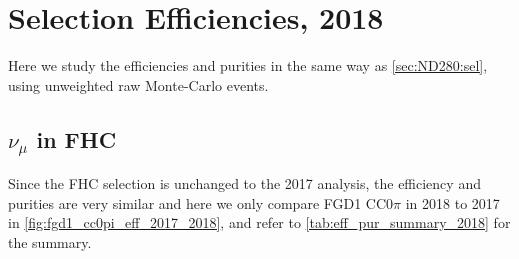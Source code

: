 \chapter{Selection Efficiencies, 2018}
\label{chap:eff_2018}

Here we study the efficiencies and purities in the same way as \autoref{sec:ND280:sel}, using unweighted raw Monte-Carlo events.

\section{$\nu_\mu$ in FHC}
Since the FHC selection is unchanged to the 2017 analysis, the efficiency and purities are very similar and here we only compare FGD1 CC0$\pi$ in 2018 to 2017 in \autoref{fig:fgd1_cc0pi_eff_2017_2018}, and refer to \autoref{tab:eff_pur_summary_2018} for the summary.

